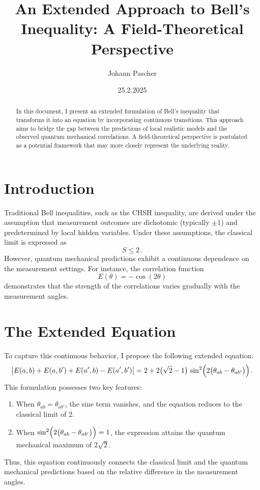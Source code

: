 \documentclass[12pt,landscape]{article}
\title{An Extended Approach to Bell's Inequality: A Field-Theoretical Perspective}
\author{Johann Pascher}
\date{25.2.2025}
\begin{document}
	\maketitle
	
	\begin{abstract}
		In this document, I present an extended formulation of Bell's inequality that transforms it into an equation by incorporating continuous transitions. This approach aims to bridge the gap between the predictions of local realistic models and the observed quantum mechanical correlations. A field-theoretical perspective is postulated as a potential framework that may more closely represent the underlying reality.
	\end{abstract}
	
	\section*{Introduction}
	Traditional Bell inequalities, such as the CHSH inequality, are derived under the assumption that measurement outcomes are dichotomic (typically $\pm1$) and predetermined by local hidden variables. Under these assumptions, the classical limit is expressed as
	\[
	S \leq 2\,.
	\]
	However, quantum mechanical predictions exhibit a continuous dependence on the measurement settings. For instance, the correlation function
	\[
	E(\theta) = -\cos(2\theta)
	\]
	demonstrates that the strength of the correlations varies gradually with the measurement angles.
	
	\section*{The Extended Equation}
	To capture this continuous behavior, I propose the following extended equation:
	\[
	\bigl|E(a,b) + E(a,b') + E(a',b) - E(a',b')\bigr| = 2 + 2\bigl(\sqrt{2}-1\bigr)\,\sin^2\Bigl(2\bigl(\theta_{ab}-\theta_{ab'}\bigr)\Bigr)\,.
	\]
	This formulation possesses two key features:
	\begin{enumerate}
		\item When $\theta_{ab} = \theta_{ab'}$, the sine term vanishes, and the equation reduces to the classical limit of 2.
		\item When $\sin^2\Bigl(2\bigl(\theta_{ab}-\theta_{ab'}\bigr)\Bigr)=1$, the expression attains the quantum mechanical maximum of $2\sqrt{2}$.
	\end{enumerate}
	Thus, this equation continuously connects the classical limit and the quantum mechanical predictions based on the relative difference in the measurement angles.
	
\end{document}
